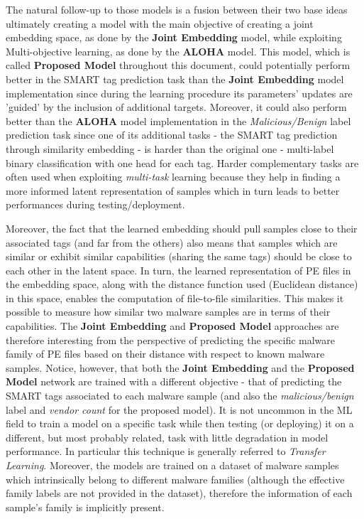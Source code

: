\documentclass[pdfa%
,cucitura%
]{toptesi}
\begin{document}
The natural follow-up to those models is a fusion between their two base ideas ultimately creating a model with the main objective of creating a joint embedding space, as done by the \textbf{Joint Embedding} model, while exploiting Multi-objective learning, as done by the \textbf{ALOHA} model. This model, which is called \textbf{Proposed Model} throughout this document, could potentially perform better in the SMART tag prediction task than the \textbf{Joint Embedding} model implementation since during the learning procedure its parameters' updates are 'guided' by the inclusion of additional targets. Moreover, it could also perform better than the \textbf{ALOHA} model implementation in the \textit{Malicious/Benign} label prediction task since one of its additional tasks - the SMART tag prediction through similarity embedding - is harder than the original one - multi-label binary classification with one head for each tag. Harder complementary tasks are often used when exploiting \textit{multi-task} learning because they help in finding a more informed latent representation of samples which in turn leads to better performances during testing/deployment.

Moreover, the fact that the learned embedding should pull samples close to their associated tags (and far from the others) also means that samples which are similar or exhibit similar capabilities (sharing the same tags) should be close to each other in the latent space. In turn, the learned representation of PE files in the embedding space, along with the distance function used (Euclidean distance) in this space, enables the computation of file-to-file similarities. This makes it possible to measure how similar two malware samples are in terms of their capabilities. The \textbf{Joint Embedding} and \textbf{Proposed Model} approaches are therefore interesting from the perspective of predicting the specific malware family of PE files based on their distance with respect to known malware samples. Notice, however, that both the \textbf{Joint Embedding} and the \textbf{Proposed Model} network are trained with a different objective - that of predicting the SMART tags associated to each malware sample (and also the \textit{malicious/benign} label and \textit{vendor count} for the proposed model). It is not uncommon in the ML field to train a model on a specific task while then testing (or deploying) it on a different, but most probably related, task with little degradation in model performance. In particular this technique is generally referred to \textit{Transfer Learning}. Moreover, the models are trained on a dataset of malware samples which intrinsically belong to different malware families (although the effective family labels are not provided in the dataset), therefore the information of each sample's family is implicitly present.
\end{document}
